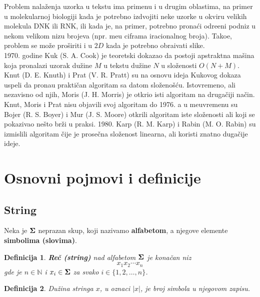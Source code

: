 \documentclass[a4paper,12pt]{article}
\newtheorem{dfn}{Definicija}[section]
\begin{document}
Problem nala\v zenja uzorka u tekstu ima primenu i u drugim oblastima, na primer u molekularnoj biologiji kada je potrebno izdvojiti neke uzorke u okviru velikih molekula DNK ili RNK, ili kada je, na primer, potrebno prona\' ci odre\dj eni podniz u nekom velikom nizu brojeva (npr. me\dj u ciframa iracionalnog broja). Tako\dj e, problem se mo\v ze pro\v siriti i u $2D$ kada je potrebno obra\dj ivati slike.
\\

1970. godine Kuk (S. A. Cook) je teoretski dokazao da postoji apstraktna ma\v sina koja pronalazi uzorak du\v zine $M$ u tekstu du\v zine $N$ u slo\v zenosti $O(N + M)$. Knut (D. E. Knuth) i Prat (V. R. Pratt) su na osnovu ideja Kukovog dokaza uspeli da prona\dj u prakti\v can algoritam sa datom slo\v zeno\v s\' cu. Istovremeno, ali nezavisno od njih, Moris (J. H. Morris) je otkrio isti algoritam na druga\v ciji na\v cin. Knut, Moris i Prat nisu objavili svoj algoritam do 1976. a u me\dj uvremenu su Bojer (R. S. Boyer) i Mur (J. S. Moore) otkrili algoritam iste slo\v zenosti ali koji se pokazivao ne\v sto br\v zi u praksi. 1980. Karp (R. M. Karp) i Rabin (M. O. Rabin) su izmislili algoritam \v cije je prose\v cna slo\v zenost linearna, ali koristi znatno duga\v cije ideje.

\section{Osnovni pojmovi i definicije}

\subsection{String}

Neka je $\bf \Sigma$ neprazan skup, koji nazivamo {\bf alfabetom}, a njegove elemente {\bf simbolima (slovima)}.

\begin{dfn}

{\bf Re\v c (string)} nad alfabetom $\bf \Sigma$ je kona\v can niz $$x_1x_2 \cdots x_n$$ gde je $n \in \mathbb{N}$ i $x_i \in \bf \Sigma$ za svako $i \in \{ 1, 2, \ldots, n \}$.

\end{dfn}

\begin{dfn}

Du\v zina stringa $x$, u oznaci $|x|$, je broj simbola u njegovom zapisu.

\end{dfn}
\end{document}
